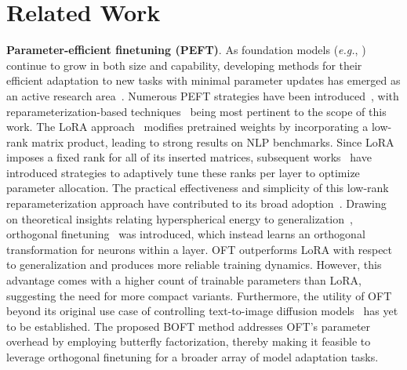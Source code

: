 \section{Related Work}

\textbf{Parameter-efficient finetuning (PEFT)}. As foundation models (\emph{e.g.}, \cite{brown2020language,radford2021learning,rombach2022high,kirillov2023segment}) continue to grow in both size and capability, developing methods for their efficient adaptation to new tasks with minimal parameter updates has emerged as an active research area~\cite{treviso2023efficient,ding2023parameter,lialin2023scaling}. Numerous PEFT strategies have been introduced~\cite{houlsby2019parameter,aghajanyan2020intrinsic,hulora2022,edalati2022krona,wang2022adamix,gheini2021cross,zaken2022bitfit,guo2020parameter,sung2021training,ansell2022composable,lester2021power,li2021prefix,vu2022spot,he2021towards,mao2021unipelt,karimi2021compacter,liu2022few,sung2022lst,chen2022parameter,jia2022visual,chen2022adaptformer,zhang2022neural,jie2023fact,lian2022scaling,luo2023towards}, with reparameterization-based techniques~\cite{aghajanyan2020intrinsic,hulora2022,edalati2022krona} being most pertinent to the scope of this work. The LoRA approach~\cite{hulora2022} modifies pretrained weights by incorporating a low-rank matrix product, leading to strong results on NLP benchmarks. Since LoRA imposes a fixed rank for all of its inserted matrices, subsequent works~\cite{zhang2022adaptive,valipour2022dylora,zhang2023increlora} have introduced strategies to adaptively tune these ranks per layer to optimize parameter allocation. The practical effectiveness and simplicity of this low-rank reparameterization approach have contributed to its broad adoption~\cite{dettmers2023qlora,zi2023delta,chavan2023one}. Drawing on theoretical insights relating hyperspherical energy to generalization~\cite{liu2018learning,liu2021orthogonal}, orthogonal finetuning~\cite{qiu2023controlling} was introduced, which instead learns an orthogonal transformation for neurons within a layer. OFT outperforms LoRA with respect to generalization and produces more reliable training dynamics. However, this advantage comes with a higher count of trainable parameters than LoRA, suggesting the need for more compact variants. Furthermore, the utility of OFT beyond its original use case of controlling text-to-image diffusion models~\cite{qiu2023controlling} has yet to be established. The proposed BOFT method addresses OFT’s parameter overhead by employing butterfly factorization, thereby making it feasible to leverage orthogonal finetuning for a broader array of model adaptation tasks.


